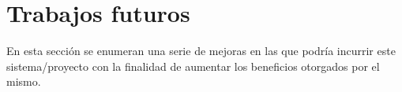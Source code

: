     
    

\section{Trabajos futuros}
\par En esta sección se enumeran una serie de mejoras en las que podría incurrir este sistema/proyecto con la finalidad de aumentar los beneficios otorgados por el mismo.

